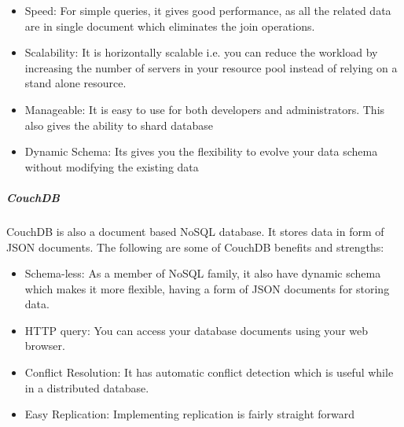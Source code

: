  \begin{itemize}
  \item Speed: For simple queries, it gives good performance, as all the related data are in single document which eliminates the join operations.
  \item Scalability: It is horizontally scalable i.e. you can reduce the workload by increasing the number of servers in your resource pool instead of relying on a stand alone resource.
  \item Manageable: It is easy to use for both developers and administrators. This also gives the ability to shard database
  \item Dynamic Schema: Its gives you the flexibility to evolve your data schema without modifying the existing data
\end{itemize}

\subparagraph{CouchDB} 
\label{sec:sec01}
CouchDB is also a document based NoSQL database.
It stores data in form of JSON documents. The following are some of CouchDB benefits and strengths:
 \begin{itemize}
  \item Schema-less: As a member of NoSQL family, it also have dynamic schema which makes it more flexible, having a form of JSON documents for storing data.
  \item HTTP query: You can access your database documents using your web browser.
  \item Conflict Resolution: It has automatic conflict detection which is useful while in a distributed database.
  \item Easy Replication: Implementing replication is fairly straight forward
\end{itemize}



